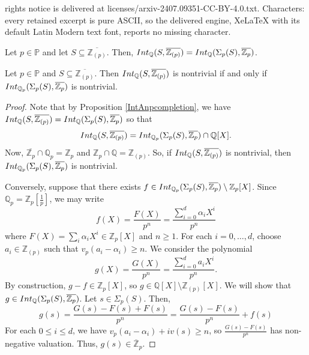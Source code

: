 \documentclass[10pt,a4paper]{amsart}
\newcommand{\IntQ}{\Int_{\Q}}
\newcommand{\Int}{\textnormal{Int}}
\newcommand{\PP}{\mathbb{P}}
\newcommand{\Q}{\mathbb{Q}}
\newcommand{\Z}{\mathbb{Z}}
\newcommand{\oQZp}{\overline{\Z_{(p)}}}
\newcommand{\oZp}{\overline{\Z_p}}
\newcommand{\oZ}{\overline{\Z}}
\begin{document}
rights notice is delivered at licenses/arxiv-2407.09351-CC-BY-4.0.txt. Characters: every retained excerpt is pure ASCII, so the delivered engine, XeLaTeX with its default Latin Modern text font, reports no missing character.
\begin{Prop}\label{IntAnpcompletion}
Let $p \in \PP$ and let $S \subseteq \oQZp$. Then, $\IntQ(S,\oQZp) = \IntQ(\Sigma_p(S),\oZp)$. %
\end{Prop}

\begin{Prop}\label{2 iff 3}
Let $p \in \PP$ and $S \subseteq \oQZp$. Then $\IntQ(S,\oQZp)$ is nontrivial if and only if $\Int_{\Q_p}(\Sigma_p(S),\oZp)$ is nontrivial. 
\end{Prop}

\begin{proof}
Note that by Proposition \ref{IntAnpcompletion},  we have $\IntQ(S,\oQZp)=\IntQ(\Sigma_p(S),\oZp)$ so that
\begin{equation*}
\IntQ(S,\oQZp)=\Int_{\Q_p}(\Sigma_p(S),\oZp)\cap\Q[X].
\end{equation*}
Now, $\oZp \cap \Q_p = \Z_p$ and $\Z_p \cap \Q = \Z_{(p)}$. So, if $\IntQ(S,\oQZp)$ is nontrivial, then $\Int_{\Q_p}(\Sigma_p(S),\oZp)$ is nontrivial.

Conversely, suppose that there exists $f\in\Int_{\Q_p}(\Sigma_p(S),\oZp)\setminus\Z_p[X]$. Since $\Q_p=\Z_p[\frac{1}{p}]$, we may write
\begin{equation*}
f(X)=\frac{F(X)}{p^n}=\frac{\sum_{i=0}^d \alpha_i X^i}{p^n}
\end{equation*}
where $F(X)=\sum_i\alpha_iX^i\in\Z_p[X]$ and $n\geq1$. For each $i=0, \ldots, d$, choose $a_i \in \Z_{(p)}$ such that $v_p(a_i - \alpha_i) \geq n$. We consider the polynomial
\begin{equation*}
g(X)=\frac{G(X)}{p^n}=\frac{\sum_{i=0}^d a_i X^i}{p^n}.
\end{equation*}
By construction, $g-f \in \Z_p[X]$, so $g \in \Q[X]\setminus \Z_{(p)}[X]$. We will show that $g\in \IntQ(\Sigma_p(S),\oZp)$. Let $s\in \Sigma_p(S)$. Then,
\begin{equation*}
g(s)=\frac{G(s)-F(s)+F(s)}{p^n}=\frac{G(s)-F(s)}{p^n}+f(s)
\end{equation*}
For each $0\leq i \leq d$, we have $v_p(a_i-\alpha_i)+iv(s)\geq n$, so  $\frac{G(s)-F(s)}{p^n}$ has non-negative valuation. Thus, $g(s) \in \oZ_p$.
\end{proof}
\end{document}
